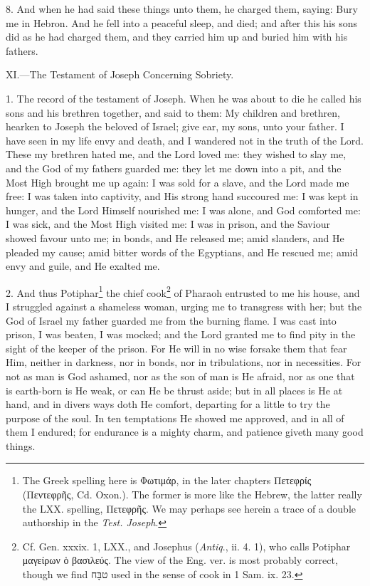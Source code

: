 8. And when he had said these things unto them, he charged them, saying: Bury me in Hebron. And he fell into a peaceful sleep, and died; and after this his sons did as he had charged them, and they carried him up and buried him with his fathers.


XI.—The Testament of Joseph Concerning Sobriety.

1. The record of the testament of Joseph. When he was about to die he called his sons and his brethren together, and said to them: My children and brethren, hearken to Joseph the beloved of Israel; give ear, my sons, unto your father. I have seen in my life envy and death, and I wandered not in the truth of the Lord. These my brethren hated me, and the Lord loved me: they wished to slay me, and the God of my fathers guarded me: they let me down into a pit, and the Most High brought me up again: I was sold for a slave, and the Lord made me free: I was taken into captivity, and His strong hand succoured me: I was kept in hunger, and the Lord Himself nourished me: I was alone, and God comforted me: I was sick, and the Most High visited me: I was in prison, and the Saviour showed favour unto me; in bonds, and He released me; amid slanders, and He pleaded my cause; amid bitter words of the Egyptians, and He rescued me; amid envy and guile, and He exalted me.

2. And thus Potiphar\footnote{The Greek spelling here is \textgreek{Φωτιμάρ}, in the later chapters \textgreek{Πετεφρίς} (\textgreek{Πεντεφρῆς}, Cd. Oxon.). The former is more like the Hebrew, the latter really the LXX. spelling, \textgreek{Πετεφρῆς}. We may perhaps see herein a trace of a double authorship in the \emph{Test. Joseph}.} the chief cook\footnote{Cf. Gen. xxxix. 1, LXX., and Josephus (\emph{Antiq}., ii. 4. 1), who calls Potiphar \textgreek{μαγείρων ὁ βασιλεύς}. The view of the Eng. ver. is most probably correct, though we find \texthebrew{טבָּח }used in the sense of cook in 1 Sam. ix. 23.} of Pharaoh entrusted to me his house, and I struggled against a shameless woman, urging me to transgress with her; but the God of Israel my father guarded me from the burning flame. I was cast into prison, I was beaten, I was mocked; and the Lord granted me to find pity in the sight of the keeper of the prison. For He will in no wise forsake them that fear Him, neither in darkness, nor in bonds, nor in tribulations, nor in necessities. For not as man is God ashamed, nor as the son of man is He afraid, nor as one that is earth-born is He weak, or can He be thrust aside; but in all places is He at hand, and in divers ways doth He comfort, departing for a little to try the purpose of the soul. In ten temptations He showed me approved, and in all of them I endured; for endurance is a mighty charm, and patience giveth many good things.

